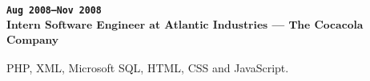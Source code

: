 \subsubsection{
\textsubscript{
\uppercase{\texttt{Aug 2008--Nov 2008}}\\
Intern Software Engineer at Atlantic Industries --- The Cocacola Company
}
}
PHP, XML, Microsoft SQL, HTML, CSS and JavaScript.
